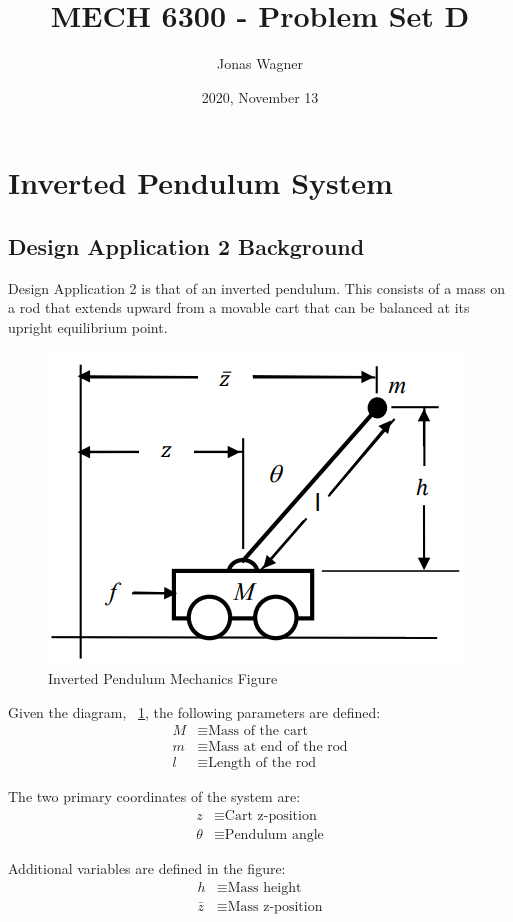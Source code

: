 \documentclass[]{article}
\title{MECH 6300 - Problem Set D}
\author{Jonas Wagner}
\date{2020, November 13}
\begin{document}
\maketitle

\section{Inverted Pendulum System}

	\subsection{Design Application 2 Background}
	
		Design Application 2 is that of an inverted pendulum. This consists of a mass on a rod that extends upward from a movable cart that can be balanced at its upright equilibrium point.
		
		\begin{figure}[h]
			\centering
			\includegraphics[width=0.5\linewidth]{Fig/DesignApplication2}
			\caption[]{Inverted Pendulum Mechanics Figure}
			\label{fig:designapplication2}
		\end{figure}
		
		Given the diagram, \figurename \ \ref{fig:designapplication2}, the following parameters are defined:
		\begin{align*}
			M &\equiv \text{Mass of the cart}\\
			m &\equiv \text{Mass at end of the rod}\\
			l &\equiv \text{Length of the rod}
		\end{align*}
		
		The two primary coordinates of the system are:
		\begin{align*}
			z &\equiv \text{Cart z-position}\\
			\theta &\equiv \text{Pendulum angle}
		\end{align*}
		
		Additional variables are defined in the figure:
		\begin{align*}
			h &\equiv \text{Mass height}\\
			\bar{z} &\equiv \text{Mass z-position}
		\end{align*} 
		
\end{document}

